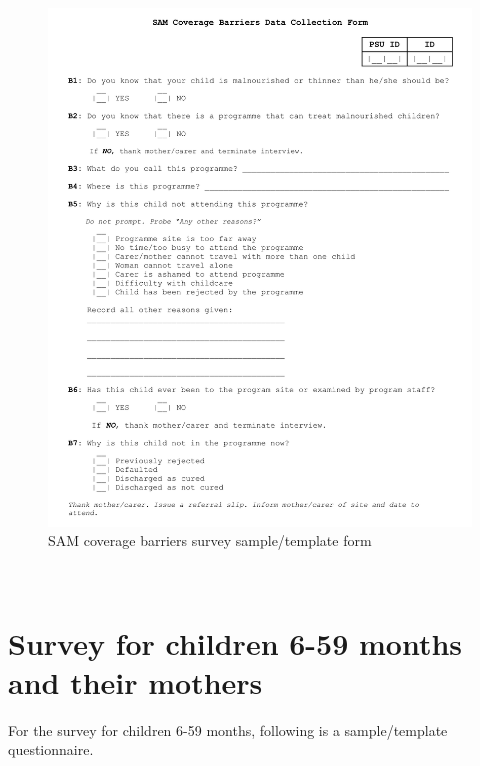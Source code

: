 \documentclass[12pt,a4paper]{book}
\theoremstyle{definition}
\theoremstyle{definition}
\theoremstyle{definition}
\theoremstyle{remark}
\begin{document}
\begin{figure}[H]

{\centering \includegraphics[width=29.15in]{forms/samBarriersForm} 

}

\caption{SAM coverage barriers survey sample/template form}\label{fig:sambarriers}
\end{figure}

~

\hypertarget{survey-for-children-6-59-months-and-their-mothers}{%
\section{Survey for children 6-59 months and their
mothers}\label{survey-for-children-6-59-months-and-their-mothers}}

For the survey for children 6-59 months, following is a sample/template
questionnaire.

~
\end{document}
